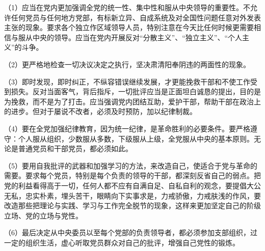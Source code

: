 （1）应当在党内更加强调全党的统一性、集中性和服从中央领导的重要性。不允许任何党员与任何地方党部，有标新立异、自成系统及对全国性问题任意对外发表主张的现象。要求各个独立作区域领导人员，特别注意在今天比任何时候更需要相信与服从中央的领导。应当在党内开展反对“分散主义”、“独立主义”、“个人主义”的斗争。

（2）更严格地检查一切决议决定之执行，坚决肃清阳奉阴违的两面性的现象。

（3）即时发现，即时纠正，不纵容错误继续发展，才更能挽救干部和不使工作受到损失。反对当面客气，背后指斥，一切批评应当是正面坦白诚恳的提出，目的是为挽救，而不是为了打击。应当强调党内团结互助，爱护干部，帮助干部在政治上的进步。但对于屡说不改者，必须及时预防，加以纪律制裁。

（4）要在全党加强纪律教育，因为统一纪律，是革命胜利的必要条件。要严格遵守：个人服从组织，少数服从多数，下级服从上级，全党服从中央的基本原则。无论是普通党员和干部党员，都必须如此。

（5）要用自我批评的武器和加强学习的方法，来改造自己，使适合于党与革命的需要。要求每个党员，特别是每个负责的领导的干部，都深刻反省自己的弱点。把党的利益看得高于一切，任何人都不应有自满自足、自私自利的观念，要提倡大公无私，忠实朴素，埋头苦干，眼睛向下实事求是，力戒骄傲，力戒肤浅的作风，要改造那些把理论与实践、学习与工作完全脱节的现象，这样来更加坚定自己的阶级立场、党的立场与党性。

（6）最后决定从中央委员以至每个党部的负责领导者，都必须参加支部组织，过一定的组织生活，虚心听取党员群众对自己的批评，增强自己党性的锻炼。

